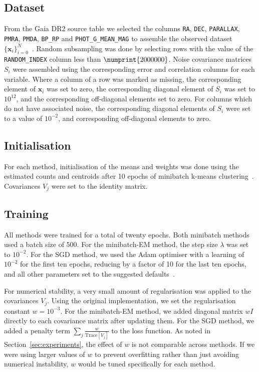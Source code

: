 \documentclass{article}
\newcommand{\bx}{\mathbf{x}}
\begin{document}
\subsection{Dataset}

From the Gaia DR2 source table we selected the columns \texttt{RA}, \texttt{DEC}, \texttt{PARALLAX}, \texttt{PMRA}, \texttt{PMDA}, \texttt{BP\_RP} and \texttt{PHOT\_G\_MEAN\_MAG} to assemble the observed dataset $\{\bx_i\}_{i=0}^N$~\cite{brownGaiaDataRelease2018}.
Random subsampling was done by selecting rows with the value of the \texttt{RANDOM\_INDEX} column less than $\numprint{2000000}$.
Noise covariance matrices $S_i$ were assembled using the corresponding error and correlation columns for each variable.
Where a column of a row was marked as missing, the corresponding element of $\bx_i$ was set to zero, the corresponding diagonal element of $S_i$ was set to $10^{12}$, and the corresponding off-diagonal elements set to zero.
For columns which do not have associated noise, the corresponding diagonal elements of $S_i$ were set to a value of $10^{-2}$, and corresponding off-diagonal elements to zero.

\subsection{Initialisation}
For each method, initialisation of the means and weights was done using the estimated counts and centroids after 10 epochs of minibatch k-means clustering~\cite{sculleyWebscaleKmeansClustering2010}.
Covariances $V_j$ were set to the identity matrix.

\subsection{Training}

All methods were trained for a total of twenty epochs.
Both minibatch methods used a batch size of $500$.
For the minibatch-EM method, the step size $\lambda$ was set to $10^{-2}$.
For the SGD method, we used the Adam optimiser with a learning of $10^{-2}$ for the first ten epochs, reducing by a factor of 10 for the last ten epochs, and all other parameters set to the suggested defaults~\cite{kingmaAdamMethodStochastic2014}.

For numerical stability, a very small amount of regularisation was applied to the covariances $V_j$.
Using the original implementation, we set the regularisation constant $w = 10^{-3}$.
For the minibatch-EM method, we added diagonal matrix $wI$ directly to each covariance matrix after updating them.
For the SGD method, we added a penalty term $\sum_j \frac{w}{\mathrm{Trace}[V_j]}$ to the loss function.
As noted in Section~\ref{sec:experiments}, the effect of $w$ is not comparable across methods.
If we were using larger values of $w$ to prevent overfitting rather than just avoiding numerical instability, $w$ would be tuned specifically for each method.
\end{document}
